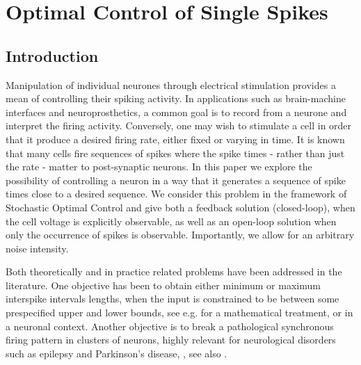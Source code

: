 \chapter{Optimal Control of Single Spikes}
\label{ch:spike_control}
\graphicspath{{../OptSpike/}}




\section{Introduction} 
Manipulation of individual neurones through electrical stimulation provides a
mean of controlling their spiking activity. In applications such as
brain-machine interfaces and neuroprosthetics, a common goal is to record from a
neurone and interpret the firing activity. Conversely, one may wish to stimulate
a cell in order that it produce a desired firing rate, either fixed or varying
in time. It is known that many cells fire sequences of spikes where the spike
times - rather than just the rate - matter to post-synaptic neurons. In this
paper we explore the possibility of controlling a neuron in a way that it
generates a sequence of spike times close to a desired sequence. 
We consider this problem in the framework of Stochastic Optimal Control and
give both a feedback solution (closed-loop), when the cell voltage is
explicitly observable, as well as an open-loop solution when only the
occurrence of spikes is observable. Importantly, we allow for an
arbitrary noise intensity.

Both theoretically and in practice related problems have been
addressed in the literature. One objective has been to
obtain either minimum or maximum interspike intervals lengths,
when the input is constrained to be between some prespecified upper
and lower bounds, see e.g. \cite{Lee1994,Lefebvre1987} for a
mathematical treatment, or \cite{Danzl2009,Nabi2012,Wu2009} in a neuronal
context. Another objective is to break a pathological synchronous
firing pattern in clusters of neurons, highly relevant for neurological
disorders such as epilepsy and Parkinson's disease,
\cite{Nabi2013a,Nabi2011}, see also \cite{Feng2007b}.

